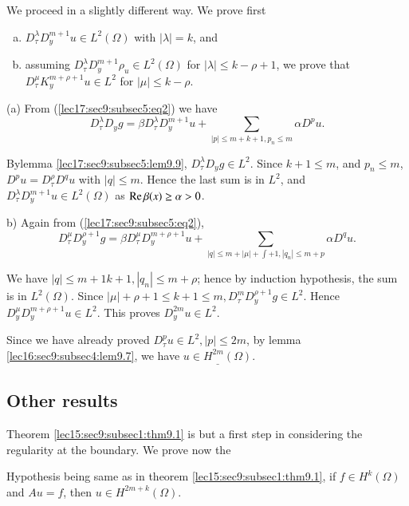 We proceed in a slightly different way. We prove first 
\begin{enumerate}[a)]
\item $D^\lambda_\tau D^{m+1}_y u \in L^2 (\Omega )$ with
  $|\lambda| = k$, and  
\item assuming $D^\lambda_\tau D^{m+1}_y \rho_u \in L^2
  (\Omega )$ for $ | \lambda | \leq k - \rho + 1$,  
  we prove that $D^\mu_\tau K^{m + \rho + 1}_y u \in L^2 $ for
  $| \mu | \leq k - \rho$.  
\end{enumerate}

(a) From (\ref{lec17:sec9:subsec5:eq2}) we have 
$$
D^\lambda_\tau D_y g = \beta D^\lambda_\tau D^{m + 1}_y u + \sum_{|p|
  \leq m+ k + 1, p_n \leq m} \alpha D^p u.  
$$

By\pageoriginale lemma \ref{lec17:sec9:subsec5:lem9.9}, $D^\lambda_\tau D_y g \in L^2$. Since $k+1
\leq m$, and $p_n \leq m$, $D^p u = D^\rho_\tau D^q u $ with $| q |
\leq m$. Hence the last sum is in $L^2$, and $D^\lambda_\tau D^{m+1}_y
u \in L^2 (\Omega )$ as $\operatorname{Re}  \beta (x) \geq \alpha > 0$.  

b) Again from (\ref{lec17:sec9:subsec5:eq2}), 
$$
D^\mu_\tau D^{\rho+1}_y g = \beta D^{\mu}_\tau D^{m+\rho + 1}_y u +
\sum_{| q | \leq m+ | \mu | + \int + 1, |q_n| \leq m+ p} \alpha D^q u.  
$$

We have $| q | \leq m+1 k +1, |q_n| \leq m+\rho$; hence by induction
hypothesis, the sum is in $L^2 (\Omega )$. Since $|\mu| + \rho + 1
\leq k + 1 \leq m, D^m_\tau D^{\rho + 1}_y g \in L^2$. Hence
$D^\mu_y D^{m+ \rho + 1}_y u \in L^2$. This proves $D^{2m}_y u
\in L^2$.  

Since we have already proved $D^p_\tau u \in L^2 , |p| \leq
2m$, by lemma \ref{lec16:sec9:subsec4:lem9.7}, we have $\underline{u \in H^{2m} (\Omega
  )}$.  

\subsection{Other results}\label{lec17:sec9:subsec6} 

Theorem \ref{lec15:sec9:subsec1:thm9.1} is but a first step in considering the regularity at
the boundary. We prove now the  
\begin{theorem}\label{lec17:sec9:subsec6:thm9.2}%
  Hypothesis being same as in theorem \ref{lec15:sec9:subsec1:thm9.1}, if $f \in H^k
  (\Omega )$ and $Au = f$, then $u \in H^{2m + k} (\Omega )$.  
\end{theorem}

